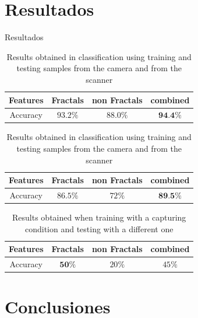 \documentclass{beamer}
\begin{document}
\section{Resultados}

\begin{frame}
{\huge Resultados}
\begin{center}
\begin{table}[htb]
\centering
\begin{tabular}{|c|c|c|c|}
    Features & Fractals & non Fractals & combined\\
    \hline
    Accuracy  & $93.2\%$ & $88.0\%$ & $\textbf{94.4\%}$\\
\end{tabular}
\caption{Results obtained in classification using training and testing samples from the scanner}
\label{table:tableFirstTest}

\begin{table}[ht!b]
\centering
\begin{tabular}{|c|c|c|c|}
    Features & Fractals & non Fractals & combined\\
    \hline
    Accuracy  & $86.5\%$ & $72\%$ & $\textbf{89.5\%}$\\
\end{tabular}
\caption{Results obtained in classification using training and testing samples from the camera and from the scanner}
\label{table:tableRobustnessTest1}
\end{table}
\end{table}

\begin{table}[htb]
\centering
\begin{tabular}{|c|c|c|c|}
    Features & Fractals & non Fractals & combined\\
    \hline
    Accuracy  & $\textbf{50}\%$ & $20\%$ & $45\%$\\
\end{tabular}
\caption{Results obtained when training with a capturing condition and testing with a different one}
\label{table:tableRobustnessTest2}
\end{table}
\end{center}
\end{frame}

\section{Conclusiones}
\end{document}
